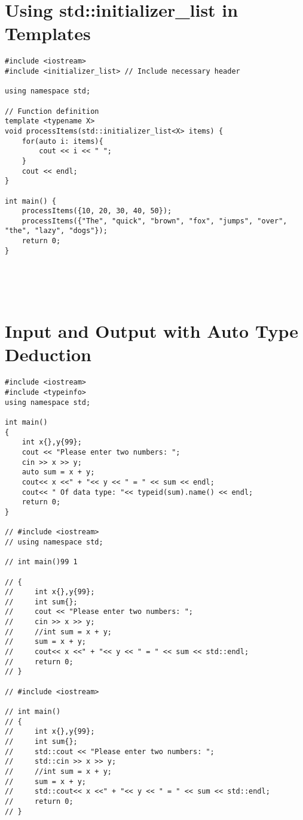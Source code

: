 \documentclass[12pt]{article}
\begin{document}
\section*{Using std::initializer_list in Templates}
\begin{verbatim}
#include <iostream>
#include <initializer_list> // Include necessary header

using namespace std;

// Function definition
template <typename X>
void processItems(std::initializer_list<X> items) {
    for(auto i: items){
        cout << i << " ";
    }
    cout << endl;
}

int main() {
    processItems({10, 20, 30, 40, 50});
    processItems({"The", "quick", "brown", "fox", "jumps", "over", "the", "lazy", "dogs"});
    return 0;
}





\end{verbatim}


\section*{Input and Output with Auto Type Deduction}
\begin{verbatim}
#include <iostream>
#include <typeinfo>
using namespace std;

int main()
{
    int x{},y{99};
    cout << "Please enter two numbers: ";
    cin >> x >> y;
    auto sum = x + y;
    cout<< x <<" + "<< y << " = " << sum << endl;
    cout<< " Of data type: "<< typeid(sum).name() << endl;
    return 0;
}
 
// #include <iostream>
// using namespace std;

// int main()99 1

// { 
//     int x{},y{99};
//     int sum{};
//     cout << "Please enter two numbers: ";
//     cin >> x >> y;
//     //int sum = x + y;
//     sum = x + y;  
//     cout<< x <<" + "<< y << " = " << sum << std::endl;
//     return 0;
// }

// #include <iostream>

// int main()
// {
//     int x{},y{99};
//     int sum{};
//     std::cout << "Please enter two numbers: ";
//     std::cin >> x >> y;
//     //int sum = x + y;
//     sum = x + y;  
//     std::cout<< x <<" + "<< y << " = " << sum << std::endl;
//     return 0;
// }
\end{verbatim}
\end{document}
